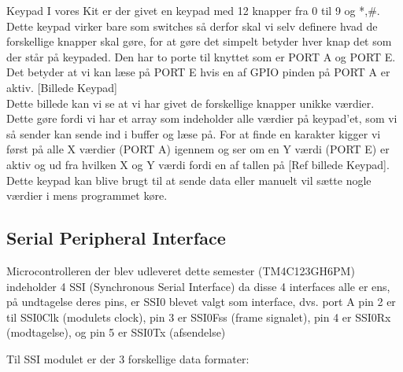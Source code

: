 Keypad
I vores Kit er der givet en keypad med 12 knapper fra 0 til 9 og *,\#. Dette keypad virker bare som switches så derfor skal vi selv definere hvad de forskellige knapper skal gøre, for at gøre det simpelt betyder hver knap det som der står på keypaded. Den har to porte til knyttet som er PORT A og PORT E. Det betyder at vi kan læse på PORT E hvis en af GPIO pinden på PORT A er aktiv. [Billede Keypad]
\\
Dette billede kan vi se at vi har givet de forskellige knapper unikke værdier. Dette gøre fordi vi har et array som indeholder alle værdier på keypad’et, som vi så sender kan sende ind i buffer og læse på. For at finde en karakter kigger vi først på alle X værdier (PORT A) igennem og ser om en Y værdi (PORT E) er aktiv og ud fra hvilken X og Y værdi fordi en af tallen på  [Ref billede Keypad].
\\
Dette keypad kan blive brugt til at sende data eller manuelt vil sætte nogle værdier i mens programmet køre.




\subsection{Serial Peripheral Interface}

Microcontrolleren der blev udleveret dette semester (TM4C123GH6PM) indeholder 4 SSI (Synchronous Serial Interface) da disse 4 interfaces alle er ens, på undtagelse deres pins, er SSI0 blevet valgt som interface, dvs. port A pin 2 er til SSI0Clk (modulets clock), pin 3 er SSI0Fss (frame signalet), pin 4 er SSI0Rx (modtagelse), og pin 5 er SSI0Tx (afsendelse)

Til SSI modulet er der 3 forskellige data formater:

